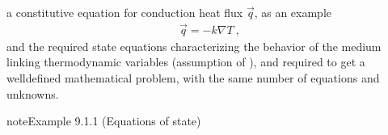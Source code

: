 \documentclass[letterpaper,10pt,english]{jupyterBook}
\begin{document}
\sphinxAtStartPar
a constitutive equation for conduction heat flux \(\vec{q}\), as an example 
\begin{equation*}
\begin{split}\vec{q} = - k \nabla T \ ,\end{split}
\end{equation*}
\sphinxAtStartPar
and the required state equations characterizing the behavior of the medium linking thermodynamic variables (assumption of   ), and required to get a well\sphinxhyphen{}defined mathematical problem, with the same number of equations and unknowns.
\label{ch/fluids/governing-equations:example-0}
\begin{sphinxadmonition}{note}{Example 9.1.1 (Equations of state)}




\end{sphinxadmonition}
\end{document}
